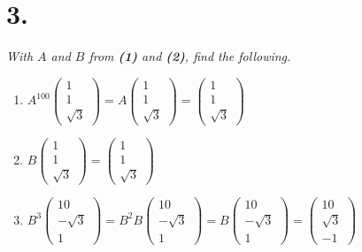 \documentclass[12pt]{article}
\begin{document}
\section*{3.}
\textit{With $A$ and $B$ from \textbf{(1)} and \textbf{(2)},
find the following.}
\begin{enumerate}[label=(\alph*)]
	\item $A^{100} \begin{pmatrix} 1 \\ 1 \\ \sqrt{3} \end{pmatrix} =
	A \begin{pmatrix} 1 \\ 1 \\ \sqrt{3} \end{pmatrix} = 
	\boxed{
		\begin{pmatrix} 1 \\ 1 \\ \sqrt{3} \end{pmatrix}
	}$
	\item $B \begin{pmatrix} 1 \\ 1 \\ \sqrt{3} \end{pmatrix}  =
	\boxed{
		\begin{pmatrix} 1 \\ 1 \\ \sqrt{3} \end{pmatrix}
	}$
	\item $B^3 \begin{pmatrix} 10 \\ -\sqrt{3} \\ 1 \end{pmatrix} =
	B^2 B \begin{pmatrix} 10 \\ -\sqrt{3} \\ 1 \end{pmatrix} =
	B \begin{pmatrix} 10 \\ -\sqrt{3} \\ 1 \end{pmatrix} =
	\boxed{
		\begin{pmatrix} 10 \\ \sqrt{3} \\ -1 \end{pmatrix}
	}$
\end{enumerate}
\end{document}
